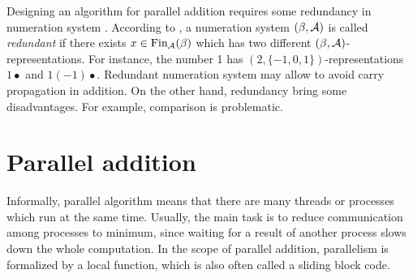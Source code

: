 Designing an algorithm for parallel addition requires some redundancy in numeration system \cite{kornerup}. According to \cite{redundant}, a numeration system $(\beta,\mathcal{A})$ is called \emph{redundant} if there exists $x \in \text{Fin}_{\mathcal{A}}(\beta)$ which has two different $(\beta,\mathcal{A})$-representations. For instance, the number 1 has $(2,\{-1,0,1\})$-representations $1\bullet$ and $1(-1)\bullet$.
Redundant numeration system may allow to avoid carry propagation in addition. On the other hand, redundancy bring some disadvantages. For example, comparison is problematic.  


\section{Parallel addition}
Informally, parallel algorithm means that there are many threads or processes which run at the same time. Usually, the main task is to reduce communication among processes to minimum, since waiting for a result of another process slows down the whole computation. In the scope of parallel addition, parallelism is formalized by a  local function, which is also often called a sliding block code.

